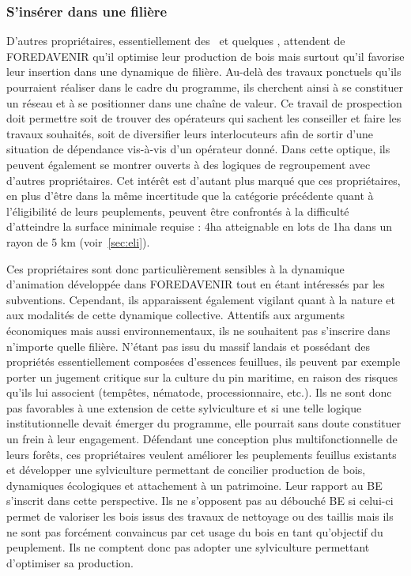 \documentclass[12pt]{report}
\begin{document}
\subsubsection{S'insérer dans une filière}

D’autres propriétaires, essentiellement des~ et
quelques , attendent de FOREDAVENIR qu’il optimise leur
production de bois mais surtout qu’il favorise leur insertion dans une dynamique
de filière. Au-delà des travaux ponctuels qu’ils pourraient réaliser dans le
cadre du programme, ils cherchent ainsi à se constituer un réseau et à se
positionner dans une chaîne de valeur. Ce travail de prospection doit permettre
soit de trouver des opérateurs qui sachent les conseiller et faire les travaux
souhaités, soit de diversifier leurs interlocuteurs afin de sortir d’une
situation de dépendance vis-à-vis d’un opérateur donné. Dans cette optique,
ils peuvent également se montrer ouverts à des logiques de regroupement avec
d’autres propriétaires. Cet intérêt est d’autant plus marqué que ces
propriétaires, en plus d’être dans la même incertitude que la catégorie
précédente quant à l’éligibilité de leurs peuplements, peuvent être confrontés à
la difficulté d’atteindre la surface minimale requise : 4ha atteignable en lots
de 1ha dans un rayon de 5 km (voir~\ref{sec:eli}). 

Ces propriétaires sont donc
particulièrement sensibles à la dynamique d’animation développée dans
FOREDAVENIR tout en étant intéressés par les subventions. Cependant, ils apparaissent également vigilant quant à la nature et
aux modalités de cette dynamique collective. Attentifs aux arguments économiques
mais aussi environnementaux, ils ne souhaitent pas s’inscrire dans n’importe
quelle filière. N'étant pas issu du massif landais et possédant des propriétés
essentiellement composées d’essences feuillues, ils peuvent par exemple porter
un jugement critique sur la culture du pin maritime, en raison des risques
qu’ils lui associent (tempêtes, nématode, processionnaire, etc.). Ils ne sont donc
pas favorables à une extension de cette sylviculture et si une telle logique
institutionnelle devait émerger du programme, elle pourrait sans doute
constituer un frein à leur engagement. Défendant une conception plus
multifonctionnelle de leurs forêts, ces propriétaires veulent améliorer les
peuplements feuillus existants et développer une sylviculture permettant de
concilier production de bois, dynamiques écologiques et attachement à un
patrimoine. Leur rapport au BE s’inscrit dans cette perspective. Ils ne
s’opposent pas au débouché BE si celui-ci permet de valoriser les bois issus
des travaux de nettoyage ou des taillis mais ils ne
sont pas forcément convaincus par cet usage du bois en tant qu'objectif du
peuplement. Ils ne comptent donc pas adopter
une sylviculture permettant d’optimiser sa production.
\end{document}
